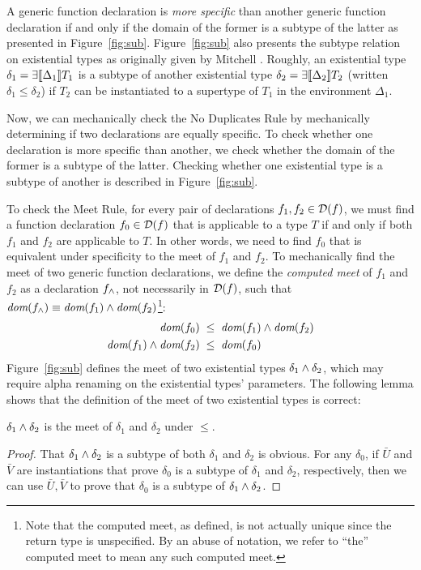 

A generic function declaration is \emph{more specific} than another generic function declaration
if and only if the domain of the former is a subtype of the latter as presented in Figure~\ref{fig:sub}.
Figure~\ref{fig:sub} also presents the subtype relation on existential types
as originally given by Mitchell \cite{mitchell88}.
Roughly, an existential type $\delta_1 = \exists \llbracket {\Delta_1} \rrbracket T_1$ is a
subtype of another existential type $\delta_2 = \exists\llbracket {\Delta_2} \rrbracket T_2$
(written $\delta_1 \le \delta_2$)
if $T_2$ can be instantiated to a supertype of $T_1$ in the environment $\Delta_1$.


Now, we can mechanically check the No Duplicates Rule
by mechanically determining if two declarations are equally specific.
To check whether one declaration is more specific than another,
we check whether the domain of the former is a subtype of the latter.
Checking whether one existential type is a subtype of another
is described in Figure~\ref{fig:sub}.


To check the Meet Rule, for every pair of declarations $f_1, f_2 \in \mathcal{D}(f)$,
we must find a function declaration $f_0 \in \mathcal{D}(f)$ that is
applicable to a type $T$ if and only if both $f_1$ and $f_2$ are applicable to $T$.
In other words, we need to find $f_0$ that is equivalent under specificity to
the meet of $f_1$ and $f_2$.
To mechanically find the meet of two generic function declarations,
we define the \emph{computed meet} of $f_1$ and $f_2$ as
a declaration $f_\wedge$, not necessarily in $\mathcal{D}(f)$,
such that $\textit{dom}(f_\wedge) \equiv \textit{dom}(f_1) \wedge \textit{dom}(f_2)$\footnote{Note that the computed meet, as defined,
is not actually unique since the return type is unspecified.
By an abuse of notation, we refer to ``the'' computed meet to mean any such computed meet.}: \begin{align*}
  \textit{dom}(f_0) &\;\le\; \textit{dom}(f_1) \wedge \textit{dom}(f_2) \\
  \textit{dom}(f_1) \wedge \textit{dom}(f_2) &\;\le\; \textit{dom}(f_0)
\end{align*}
Figure~\ref{fig:sub} defines the meet of two existential types $\delta_1 \wedge \delta_2$,
which may require alpha renaming on the existential types' parameters.
The following lemma shows that the definition of the meet of two existential types is correct:
\begin{lemma}\label{lem:meet}
$\delta_1 \wedge \delta_2$ is the meet of $\delta_1$ and $\delta_2$ under $\le$.
\end{lemma}
\begin{proof}
That $\delta_1 \wedge \delta_2$ is a subtype of both $\delta_1$ and $\delta_2$ is obvious.
For any $\delta_0$, if $\bar{U}$ and $\bar{V}$ are instantiations that prove
$\delta_0$ is a subtype of $\delta_1$ and $\delta_2$, respectively,
then we can use $\bar{U},\bar{V}$ to prove that $\delta_0$ is a subtype of $\delta_1 \wedge \delta_2$.
\end{proof}


